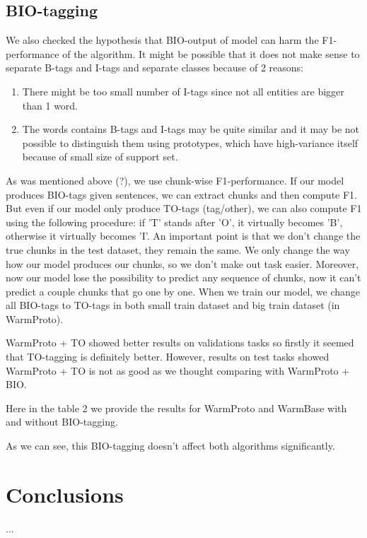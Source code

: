 \subsection{BIO-tagging} 
We also checked the hypothesis that BIO-output of model can harm the F1-performance of the algorithm. 
It might be possible that it does not make sense to separate B-tags and I-tags and separate classes because of 2 reasons:
\begin{enumerate}
	\item There might be too small number of I-tags since not all entities are bigger than 1 word.
	\item The words contains B-tags and I-tags may be quite similar and it may be not possible to distinguish them using prototypes, which have high-variance itself because of small size of support set.
\end{enumerate}
As was mentioned above (?), we use chunk-wise F1-performance. If our model produces BIO-tags given sentences, we can extract chunks and then compute F1. But even if our model only produce TO-tags (tag/other), we can also compute F1 using the following procedure: if 'T' stands after 'O', it virtually becomes 'B', otherwise it virtually becomes 'I'. An important point is that we don't change the true chunks in the test dataset, they remain the same. We only change the way how our model produces our chunks, so we don't make out task easier. Moreover, now our model lose the possibility to predict any sequence of chunks, now it can't predict a couple chunks that go one by one.
When we train our model, we change all BIO-tags to TO-tags in both small train dataset and big train dataset (in WarmProto).

WarmProto + TO showed better results on validations tasks so firstly it seemed that TO-tagging is definitely better. However, results on test tasks showed WarmProto + TO is not as good as we thought comparing with WarmProto + BIO. 

Here in the table 2 we provide the results for WarmProto and WarmBase with and without BIO-tagging.

As we can see, this BIO-tagging doesn't affect both algorithms significantly.

\section{Conclusions}
...

